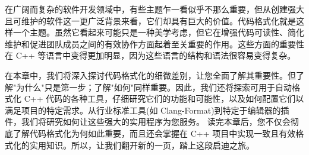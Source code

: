 在广阔而复杂的软件开发领域中，有些主题乍一看似乎不那么重要，但从创建强大且可维护的软件这一更广泛背景来看，它们却具有巨大的价值。代码格式化就是这样一个主题。虽然它看起来可能只是一种美学考虑，但它在增强代码可读性、简化维护和促进团队成员之间的有效协作方面起着至关重要的作用。这些方面的重要性在 C++ 等语言中变得更加明显，因为这些语言的结构和语法很容易变得复杂。

在本章中，我们将深入探讨代码格式化的细微差别，让您全面了解其重要性。但了解"为什么"只是第一步；了解"如何"同样重要。因此，我们还将探索可用于自动格式化 C++ 代码的各种工具，仔细研究它们的功能和可能性，以及如何配置它们以满足项目的特定需求。从行业标准工具(如 Clang-Format)到特定于编辑器的插件，我们将研究如何让这些强大的实用程序为您服务。
读完本章后，您不仅会彻底了解代码格式化为何如此重要，而且还会掌握在 C++ 项目中实现一致且有效格式化的实用知识。所以，让我们翻开新的一页，踏上这段启迪之旅。
